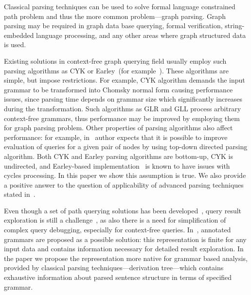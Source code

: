 \documentclass[sigconf]{acmart}
\begin{document}
Classical parsing techniques can be used to solve formal language constrained path problem and thus the more common problem---graph parsing. 
Graph parsing may be required in graph data base querying, formal verification, string-embedded language processing, and any other areas where graph structured data is used. 


Existing solutions in context-free graph querying field usually employ such parsing algorithms as CYK or Earley~(for example~\cite{ConjCFPathQuery,CFGonRDF,GraphQueryWithEarley}). 
These algorithms are simple, but impose restrictions.
For example, CYK algorithm demands the input grammar to be transformed into Chomsky normal form causing performance issues, since parsing time depends on grammar size which significantly increases during the transformation.
Such algorithms as GLR and GLL process arbitrary context-free grammars, thus performance may be improved by employing them for graph parsing problem.
Other properties of parsing algorithms also affect performance: for example, in~\cite{Hellings16} author expects that it is possible to improve evaluation of queries for a given pair of nodes by using top-down directed parsing algorithm.
Both CYK and Earley parsing algorithms are bottom-up, CYK is undirected, and Earley-based implementation~\cite{GraphQueryWithEarley} is known to have issues with cycles processing. 
In this paper we show this assumption is true.
We also provide a positive answer to the question of applicability of advanced parsing techniques stated in~\cite{Hellings16}.

Even though a set of path querying solutions has been developed~\cite{GraphQueryWithEarley,ConjCFPathQuery,QueryGraphWithData,RegularDBQuery}, query result exploration is still a challenge~\cite{hofman2015separabilityForRegQueryDebugging}, as also there is a need for simplification of complex query debugging, especially for context-free queries.
In~\cite{Hellings16}, annotated grammars are proposed as a possible solution: this representation is finite for any input data and contains information necessary for detailed result exploration.
In the paper we propose the representation more native for grammar based analysis, provided by classical parsing techniques---derivation tree---which contains exhaustive information about parsed sentence structure in terms of specified grammar.
\end{document}
